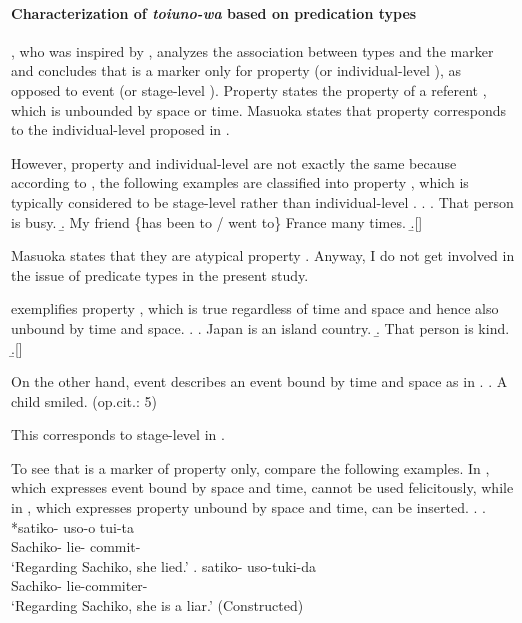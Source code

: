 \paragraph{Characterization of \textit{toiuno-wa} based on {predication} types}

, who was inspired by ,
analyzes the association between  types and
the marker  and concludes that
 is a  marker only for property  (or individual-level ),
as opposed to event  (or stage-level ).
Property  states the property of a referent \cite{masuoka87,masuoka08}, which is unbounded by space or time.
Masuoka states that property  corresponds to the
individual-level  proposed in .%
 \footnotemark
 \footnotetext
 {
 However, property  and individual-level  are
 not exactly the same because
 according to ,
 the following examples are classified into property ,
 which is typically considered to be stage-level rather than individual-level .
 \ex.
  \a. That person is busy.
  \b. My friend \{has been to / went to\} France many times.
  \b.[] \hfill{\cite[5--6, translated by NN]{masuoka08p}}
 
 Masuoka states that they are atypical property .
 Anyway, I do not get involved in the issue of predicate types in the present study.
 }
\Next exemplifies property , which is true regardless of time and space and hence also unbound by time and space.
%
\ex.
 \a. Japan is an island country.
 \b. That person is kind.
 \b.[] \hfill{\cite[4, translated by NN]{masuoka08p}}

On the other hand,
event  describes an event bound by time and space as in \Next.
%
\ex. A child smiled.  \hfill{(op.cit.: 5)}

This corresponds to stage-level  in .

To see that  is a marker of property  only,
compare the following examples.
In \Next[a], which expresses event  bound by space and time,
 cannot be used felicitously,
while in \Next[b], which expresses property 
unbound by space and time,
 can be inserted.
%
\ex.\label{ExSatiko}
\ag. *satiko- uso-o tui-ta \\
     Sachiko- lie- commit- \\
     `Regarding Sachiko, she lied.'
     \hfill{\cite[96]{masuoka12}}
\bg. satiko- uso-tuki-da \\
     Sachiko- lie-commiter- \\
     `Regarding Sachiko, she is a liar.'
     \hfill{(Constructed)}


